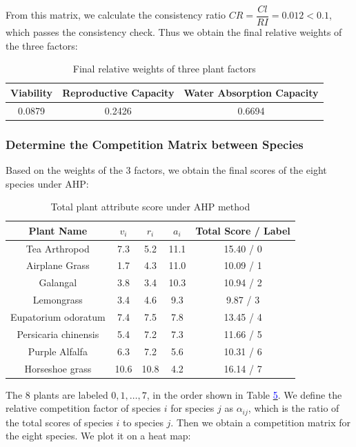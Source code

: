 \documentclass{mcmthesis}
\begin{document}
From this matrix, we calculate the consistency ratio $C R=\dfrac{C l}{R I}=0.012<0.1$, which passes the consistency check.
Thus we obtain the final relative weights of the three factors:

\begin{table}[htbp]
\centering
\caption{Final relative weights of three plant factors}
\begin{tabular}{ccc}
\toprule
Viability & Reproductive Capacity & Water Absorption Capacity \\
\midrule
0.0879 & 0.2426 & 0.6694 \\
\bottomrule
\end{tabular}
\label{tab:weights}
\end{table}

\subsubsection{Determine the Competition Matrix between Species}

\indent

Based on the weights of the $3$ factors, we obtain the final scores of the eight species under AHP:

\begin{table}[ht]
\centering
\caption{Total plant attribute score under AHP method}
\label{tab:plants}
\begin{tabular}{ccccc}
\toprule
Plant Name & $v_i$ & $r_i$ & $a_i$ & Total Score / Label \\
\midrule
Tea Arthropod & 7.3 & 5.2 & 11.1 & 15.40 / 0 \\
Airplane Grass & 1.7 & 4.3 & 11.0 & 10.09 / 1 \\
Galangal & 3.8 & 3.4 & 10.3 & 10.94 / 2 \\
Lemongrass & 3.4 & 4.6 & 9.3 & 9.87 / 3 \\
Eupatorium odoratum & 7.4 & 7.5 & 7.8 & 13.45 / 4 \\
Persicaria chinensis & 5.4 & 7.2 & 7.3 & 11.66 / 5 \\
Purple Alfalfa & 6.3 & 7.2 & 5.6 & 10.31 / 6 \\
Horseshoe grass & 10.6 & 10.8 & 4.2 & 16.14 / 7 \\
\bottomrule
\end{tabular}
\label{tab:score}
\end{table}

The $8$ plants are labeled $0,1, \ldots, 7$, in the order shown in Table  \hyperref[tab:score]{\textcolor{blue}{5}}. We define the relative competition factor of species $i$ for species $j$ as $\alpha_{i j}$, which is the ratio of the total scores of species $i$ to species $j$. Then we obtain a competition matrix for the eight species. We plot it on a heat map:
\end{document}

